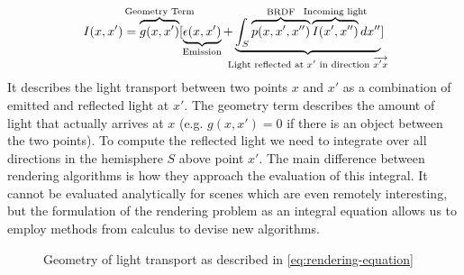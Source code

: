 \documentclass{ACGSeminar}
\begin{document}
\begin{equation} \label{eq:rendering-equation}
I(x,x')= \overbrace{g(x,x')}^{\mathclap{\text{Geometry Term}}}
         [
         \underbrace{\epsilon(x,x')}_{\mathclap{\text{Emission}}}
         + \underbrace{
         \int_{S}{\overbrace{p(x,x',x'')}^{\mathclap{\text{BRDF}}}
                  \overbrace{I(x',x'') }^{\mathclap{\text{Incoming light}}} dx''}
         }_{\mathclap{\text{Light reflected at $x'$ in direction $\overrightarrow{x'x}$}}} ]
\end{equation}
It describes the light transport between two points $x$ and $x'$ as a combination of emitted and reflected light at $x'$. The geometry term describes the amount of light that actually arrives at $x$ (e.g. $g(x,x') = 0$ if there is an object between the two points). To compute the reflected light we need to integrate over all directions in the hemisphere $S$ above point $x'$. 
The main difference between rendering algorithms is how they approach the evaluation of this integral. It cannot be evaluated analytically for scenes which are even remotely interesting, but the formulation of the rendering problem as an integral equation allows us to employ methods from calculus to devise new algorithms.


\begin{figure}[htb!]
  \begin{centering}
    \par
  \end{centering}
  \caption{Geometry of light transport as described in \eqref{eq:rendering-equation}}
  \label{fig:light-transport}
\end{figure}
\end{document}
